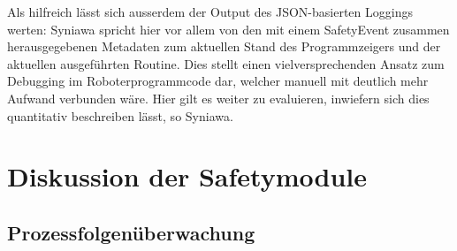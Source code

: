Als hilfreich lässt sich ausserdem der Output des JSON-basierten Loggings
werten: Syniawa spricht hier vor allem von den mit einem SafetyEvent zusammen
herausgegebenen Metadaten zum aktuellen Stand des Programmzeigers und
der aktuellen
ausgeführten Routine. Dies stellt einen vielversprechenden Ansatz zum Debugging
im Roboterprogrammcode dar, welcher manuell mit deutlich mehr Aufwand verbunden
wäre. Hier gilt es weiter zu evaluieren, inwiefern sich dies quantitativ
beschreiben lässt, so Syniawa.

\section{Diskussion der Safetymodule}

\subsection{Prozessfolgenüberwachung}

